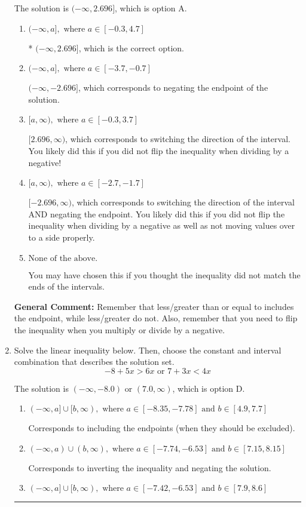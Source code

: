 \documentclass{extbook}[14pt]
\newcommand{\litem}[1]{\item #1

\rule{\textwidth}{0.4pt}}
\begin{document}
\begin{enumerate}
{The solution is \( (-\infty, 2.696] \), which is option A.\begin{enumerate}[label=\Alph*.]
\item \( (-\infty, a], \text{ where } a \in [-0.3, 4.7] \)

* $(-\infty, 2.696]$, which is the correct option.
\item \( (-\infty, a], \text{ where } a \in [-3.7, -0.7] \)

 $(-\infty, -2.696]$, which corresponds to negating the endpoint of the solution.
\item \( [a, \infty), \text{ where } a \in [-0.3, 3.7] \)

 $[2.696, \infty)$, which corresponds to switching the direction of the interval. You likely did this if you did not flip the inequality when dividing by a negative!
\item \( [a, \infty), \text{ where } a \in [-2.7, -1.7] \)

 $[-2.696, \infty)$, which corresponds to switching the direction of the interval AND negating the endpoint. You likely did this if you did not flip the inequality when dividing by a negative as well as not moving values over to a side properly.
\item \( \text{None of the above}. \)

You may have chosen this if you thought the inequality did not match the ends of the intervals.
\end{enumerate}

\textbf{General Comment:} Remember that less/greater than or equal to includes the endpoint, while less/greater do not. Also, remember that you need to flip the inequality when you multiply or divide by a negative.
}
\litem{
Solve the linear inequality below. Then, choose the constant and interval combination that describes the solution set.
\[ -8 + 5 x > 6 x \text{ or } 7 + 3 x < 4 x \]

The solution is \( (-\infty, -8.0) \text{ or } (7.0, \infty) \), which is option D.\begin{enumerate}[label=\Alph*.]
\item \( (-\infty, a] \cup [b, \infty), \text{ where } a \in [-8.35, -7.78] \text{ and } b \in [4.9, 7.7] \)

Corresponds to including the endpoints (when they should be excluded).
\item \( (-\infty, a) \cup (b, \infty), \text{ where } a \in [-7.74, -6.53] \text{ and } b \in [7.15, 8.15] \)

Corresponds to inverting the inequality and negating the solution.
\item \( (-\infty, a] \cup [b, \infty), \text{ where } a \in [-7.42, -6.53] \text{ and } b \in [7.9, 8.6] \)


\end{enumerate}}
\end{enumerate}
\end{document}
